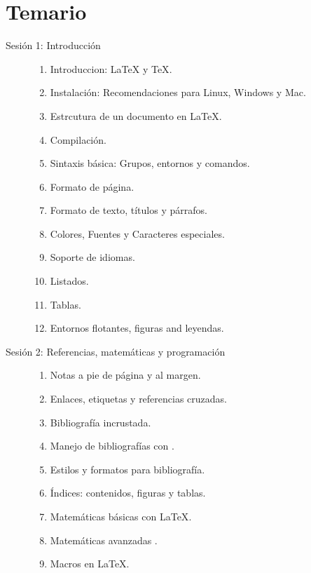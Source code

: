 \documentclass[12pt, twoside, a4paper, final]{article}
\begin{document}
    \section{Temario}
    \begin{description}
        \item[Sesión 1: Introducción] \hfill
            \begin{enumerate}
                \item Introduccion: {\LaTeX} y {\TeX}.
                \item Instalación: Recomendaciones para Linux, Windows y Mac.
                \item Estrcutura de un documento en {\LaTeX}.
                \item Compilación.
                \item Sintaxis básica: Grupos, entornos y comandos.
                \item Formato de página.
                \item Formato de texto, títulos y párrafos.
                \item Colores, Fuentes y Caracteres especiales.
                \item Soporte de idiomas.
                \item Listados.
                \item Tablas.
                \item Entornos flotantes, figuras and leyendas.
            \end{enumerate}

        \item[Sesión 2: Referencias, matemáticas y programación] \hfill
            \begin{enumerate}
                \item Notas a pie de página y al margen.
                \item Enlaces, etiquetas y referencias cruzadas.
                \item Bibliografía incrustada.
                \item Manejo de bibliografías con .
                \item Estilos y formatos para bibliografía.
                \item Índices: contenidos, figuras y tablas.
                \item Matemáticas básicas con {\LaTeX}.
                \item Matemáticas avanzadas .
                \item Macros en {\LaTeX}.
            \end{enumerate}


\end{description}
\end{document}
